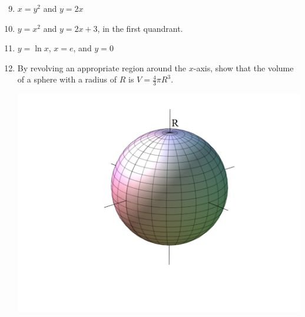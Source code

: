 \documentclass[12pt]{article}
\newif\ifans
\begin{document}

\begin{enumerate}
\setcounter{enumi}{8}

\item $x=y^2$ and $y=2x$

\ifans{\fbox{$\frac{\pi}{240}$}} \fi

\item $y=x^2$ and $y=2x+3$, in the first quandrant.

\ifans{\fbox{$\frac{45\pi}{2}$}} \fi

\item $y=\ln{x}$, $x=e$, and $y=0$

\ifans{\fbox{$\frac{\pi}{2}\left(1+e^2\right)$}} \fi

\newpage

\item By revolving an appropriate region around the $x$-axis, show that the volume of a sphere with a radius of $R$ is $V=\frac{4}{3}\pi R^3$.

\begin{center}
\includegraphics[scale=0.27]{sphere.pdf}
\end{center}

\ifans{\fbox{\parbox{1\linewidth}{We revolve the region enclosed by the semicircle $y=\sqrt{R^2-x^2}$ and the $x$ axis on the interval $[-R,R]$ around the $x$-axis.
\begin{align*}
V &= \pi \int_{-R}^R (\sqrt{R^2-x^2})^2 \,dx\\
&= \pi \int_{-R}^R (R^2-x^2) \,dx\\
&= 2\pi \int_{0}^R (R^2-x^2) \,dx\\
&=2\pi\left[R^2x-\frac{1}{3}x^3\right]_{x=0}^{x=R}\\
&=2\pi\left(R^3-\frac{R^3}{3}\right)\\
&=\frac{4\pi}{3}R^3
\end{align*}
}}} \fi


\end{enumerate}
\end{document}
